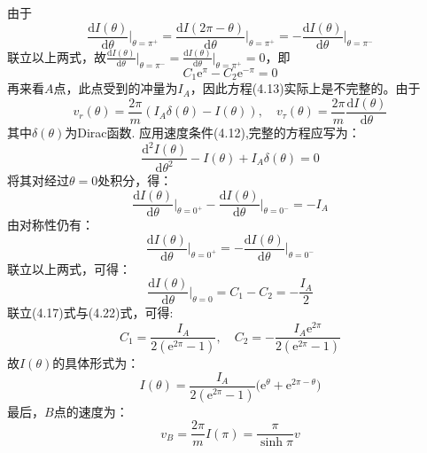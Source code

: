 \documentclass{ctexart}
\begin{document}
由于
\begin{equation}
  \frac{\mathrm{d} I(\theta)}{\mathrm{d} \theta}\Big|_{\theta=\pi^+}=\frac{\mathrm{d} I(2\pi-\theta)}{\mathrm{d} \theta}\Big|_{\theta=\pi^+}=-\frac{\mathrm{d} I(\theta)}{\mathrm{d} \theta}\Big|_{\theta=\pi^-} \tag{4.16}
\end{equation}
联立以上两式，故$\frac{\mathrm{d} I(\theta)}{\mathrm{d} \theta}\Big|_{\theta=\pi^-}=\frac{\mathrm{d} I(\theta)}{\mathrm{d} \theta}\Big|_{\theta=\pi^+}=0$，即
\begin{equation}
  C_1\mathrm{e}^{\pi}-C_2\mathrm{e}^{-\pi}=0 \tag{4.17}
\end{equation}
再来看$A$点，此点受到的冲量为$I_A$，因此方程(4.13)实际上是不完整的。由于
\begin{equation}
  v_r(\theta)=\frac{2\pi}{m}(I_A\delta(\theta)-I(\theta)),\quad v_\tau(\theta)=\frac{2\pi}{m}\frac{\mathrm{d}I(\theta)}{\mathrm{d}\theta} \tag{4.18}
\end{equation}
其中$\delta(\theta)$为Dirac函数. 应用速度条件(4.12),完整的方程应写为：
\begin{equation}
  \frac{\mathrm{d}^2 I(\theta)}{\mathrm{d} \theta^2}-{I(\theta)}+I_A\delta(\theta)=0 \tag{4.19}
\end{equation}
将其对经过$\theta=0$处积分，得：
\begin{equation}
  \frac{\mathrm{d} I(\theta)}{\mathrm{d} \theta}\Big|_{\theta=0^+}-\frac{\mathrm{d} I(\theta)}{\mathrm{d} \theta}\Big|_{\theta=0^-}=-I_A \tag{4.20}
\end{equation}
由对称性仍有：
\begin{equation}
\frac{\mathrm{d} I(\theta)}{\mathrm{d} \theta}\Big|_{\theta=0^+}=-\frac{\mathrm{d} I(\theta)}{\mathrm{d} \theta}\Big|_{\theta=0^-} \tag{4.21}
\end{equation}
联立以上两式，可得：
\begin{equation}
  \frac{\mathrm{d} I(\theta)}{\mathrm{d}\theta}\Big|_{\theta=0}=C_1-C_2=-\frac{I_A}{2} \tag{4.22}
\end{equation}
联立(4.17)式与(4.22)式，可得:
\begin{equation}
  C_1=\frac{I_A}{2(\mathrm{e}^{2\pi}-1)},\quad C_2=-\frac{I_A\mathrm{e}^{2\pi}}{2(\mathrm{e}^{2\pi}-1)} \tag{4.23}
\end{equation}
故$I(\theta)$的具体形式为：
\begin{equation}
  I(\theta)=\frac{I_A}{2(\mathrm{e}^{2\pi}-1)}\Big(\mathrm{e}^{\theta}+\mathrm{e}^{2\pi-\theta}\Big) \tag{4.24}
\end{equation}
最后，$B$点的速度为：
\begin{equation}
  v_B=\frac{2\pi}{m}I(\pi)=\frac{\pi}{\sinh{\pi}}v \tag{4.25}
\end{equation}
\clearpage
\end{document}
